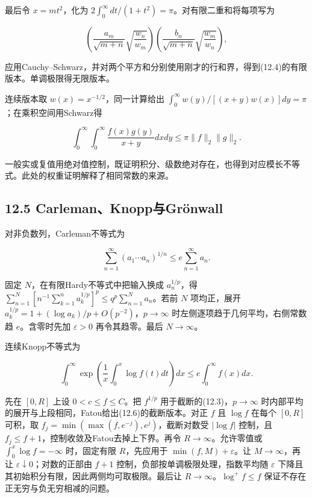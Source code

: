 \documentclass[11pt,a4paper]{article}
\begin{document}
最后令 \(x=mt^2\)，化为
\(2\int_0^\infty dt/(1+t^2)=\pi\)。对有限二重和将每项写为

\[
\left(\frac{a_m}{\sqrt{m+n}}\sqrt{\frac{w_n}{w_m}}\right)
\left(\frac{b_n}{\sqrt{m+n}}\sqrt{\frac{w_m}{w_n}}\right),
\]

应用Cauchy--Schwarz，并对两个平方和分别使用刚才的行和界，得到(12.4)的有限版本。单调极限得无限版本。

连续版本取 \(w(x)=x^{-1/2}\)，同一计算给出
\(\int_0^\infty w(y)/[(x+y)w(x)]dy=\pi\)；在乘积空间用Schwarz得

\[
\int_0^\infty\!\int_0^\infty\frac{f(x)g(y)}{x+y}dxdy
\le\pi\|f\|_2\|g\|_2.
\]

一般实或复值用绝对值控制，既证明积分、级数绝对存在，也得到对应模长不等式。此处的权重证明解释了相同常数的来源。

\subsection{12.5
Carleman、Knopp与Grönwall}\label{carlemanknoppux4e0egruxf6nwall}

对非负数列，Carleman不等式为

\[
\sum_{n=1}^\infty(a_1\cdots a_n)^{1/n}\le e\sum_{n=1}^\infty a_n.\tag{12.5}
\]

固定 \(N\)，在有限Hardy不等式中把输入换成 \(a_n^{1/p}\)，得
\(\sum_{n=1}^N[n^{-1}\sum_{k=1}^na_k^{1/p}]^p\le q^p\sum_{n=1}^Na_n\)。若前
\(N\) 项均正，展开
\(a_k^{1/p}=1+(\log a_k)/p+O(p^{-2})\)，\(p\to\infty\)
时左侧逐项趋于几何平均，右侧常数趋 \(e\)。含零时先加 \(\varepsilon>0\)
再令其趋零。最后 \(N\to\infty\)。

连续Knopp不等式为

\[
\int_0^\infty\exp\left(\frac1x\int_0^x\log f(t)dt\right)dx
\le e\int_0^\infty f(x)dx.\tag{12.6}
\]

先在 \([0,R]\) 上设 \(0<c\le f\le C\)。把 \(f^{1/p}\)
用于截断的(12.3)，\(p\to\infty\)
时内部平均的展开与上段相同，Fatou给出(12.6)的截断版本。对正 \(f\) 且
\(\log f\) 在每个 \([0,R]\) 可积，取
\(f_j=\min(\max(f,e^{-j}),e^j)\)，截断对数受 \(|\log f|\) 控制，且
\(f_j\le f+1\)，控制收敛及Fatou去掉上下界。再令
\(R\to\infty\)。允许零值或 \(\int_0^x\log f=-\infty\) 时，固定有限
\(R\)，先应用于 \(\min(f,M)+\varepsilon\)。让 \(M\to\infty\)，再让
\(\varepsilon\downarrow0\)；对数的正部由 \(f+1\)
控制，负部按单调极限处理，指数平均随 \(\varepsilon\)
下降且其初始积分有限，因此两侧均可取极限。最后让
\(R\to\infty\)。\(\log^+f\le f\) 保证不存在正无穷与负无穷相减的问题。
\end{document}
